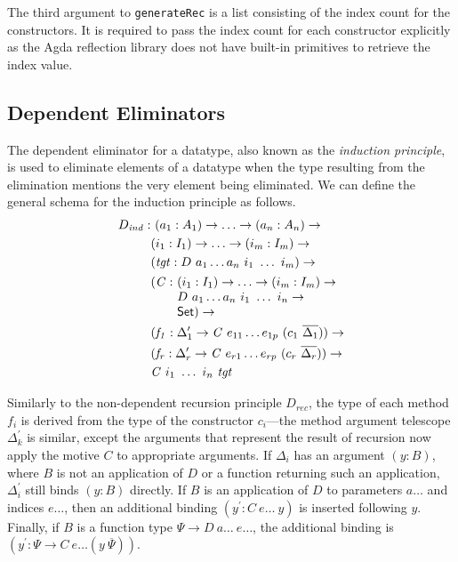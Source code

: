 \documentclass[sigplan,10pt]{acmart}
\begin{document}
The third argument to {\tt generateRec} is a list consisting of the index count for the constructors. It is required to pass the index count for each constructor explicitly as the Agda reflection library does not have built-in primitives to retrieve the index value.

\subsection{Dependent Eliminators}
\label{sec:sec3.2}

The dependent eliminator for a datatype, also known as the \emph{induction principle}, is used to eliminate elements of a datatype when the type resulting from the elimination mentions the very element being eliminated. We can define the general schema for the induction principle as follows.
\begin{align*}
D_{\mathit{ind}} : &\ (a_1 : A_1) \to \ldots \to (a_n : A_n) \to\\
& (i_1 : I_1) \to \ldots \to (i_m : I_m) \to\\
& (\mathit{tgt} : D\ a_1 \ldots a_n\ i_1\ \ldots\ i_m) \to\\
& \begin{array}{@{}l@{}l}(\mathit{C} :\ & (i_1 : I_1) \to \ldots \to (i_m : I_m) \to\\  & D\ a_1 \ldots a_n\ i_1\ \ldots\ i_n \to\\ &\SET{})\to\end{array} \\
& (\mathit{f_1} : \Delta_1^\prime \to \mathit{C}\ e_{11} \ldots e_{1p}\ (c_1\ \overline{\Delta_1})) \to \\
& (\mathit{f_r} : \Delta_r^\prime \to \mathit{C}\ e_{r1} \ldots e_{rp}\ (c_r\ \overline{\Delta_r})) \to \\
& \mathit{C}\ i_1\ \ldots\ i_n\ \mathit{tgt}
\end{align*}

Similarly to the non-dependent recursion principle $D_{\mathit{rec}}$, the type of each method $f_i$ is derived from the type of the constructor $c_i$---the method argument telescope $\Delta_k^\prime$ is similar, except the arguments that represent the result of recursion now apply the motive $C$ to appropriate arguments.
If $\Delta_i$ has an argument $(y : B)$, where $B$ is not an application of $D$ or a function returning such an application, $\Delta_i^\prime$ still binds $(y : B)$ directly.
If $B$ is an application of $D$ to parameters $a\ldots$ and indices $e\ldots$, then an additional binding $(y^\prime : C\ e\ldots\ y)$ is inserted following $y$.
Finally, if $B$ is a function type $\Psi \to D\ a\ldots\ e\ldots$, the additional binding is $(y^\prime : \Psi \to C\ e\ldots (y\ \overline{\Psi}))$. 
\end{document}
